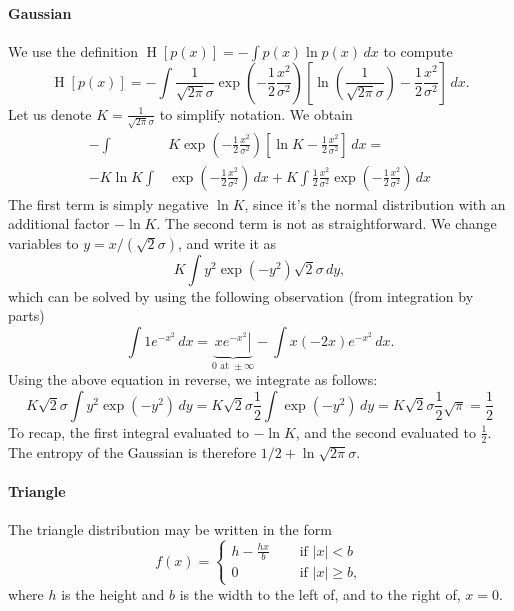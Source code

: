 \documentclass[12pt, a4paper]{article}
\newcommand{\abs}[1]{\left\lvert#1\right\rvert}
\renewcommand{\H}{\operatorname{H}}
\begin{document}
\paragraph{Gaussian} We use the definition $\H\left[p(x)\right] = - \int p(x) \ln p(x) \, dx$ to compute  
\begin{equation*}
	\H\left[p(x)\right] = 
	- \int \frac{1}{\sqrt{2 \pi} \sigma} 
	\exp \left( - \frac{1}{2} \frac{x^2}{\sigma^2} \right) 
	\left[ \ln \left( \frac{1}{\sqrt{2 \pi} \sigma } \right) - \frac{1}{2} \frac{x^2}{\sigma^2} \right] \, dx.
\end{equation*}
Let us denote $K = \frac{1}{\sqrt{2 \pi} \sigma} $ to simplify notation. We obtain
\begin{align*}
	- \int & K
	\exp \left( - \frac{1}{2} \frac{x^2}{\sigma^2} \right) 
	\left[ \ln K - \frac{1}{2} \frac{x^2}{\sigma^2} \right] \, dx = \\
	- K \ln K \int & 
	\exp \left( - \frac{1}{2} \frac{x^2}{\sigma^2} \right) \, dx + K \int  \frac{1}{2} \frac{x^2}{\sigma^2} \exp \left( - \frac{1}{2} \frac{x^2}{\sigma^2} \right)  \, dx
\end{align*}
The first term is simply negative $\ln K$, since it's the normal distribution with an additional factor $-\ln K$.
The second term is not as straightforward.
We change variables to $y = x / \left( \sqrt{2} \sigma \right)$, and write it as
\begin{equation*}
	K \int  y^2 \exp \left( - y^2 \right) \sqrt{2} \sigma \, dy,
\end{equation*}
which can be solved by using the following observation (from integration by parts)
\begin{equation*}
	\int 1 e^{-x^2} \, dx = \underbrace{\left. x e^{-x^2} \right|}_{0\text{ at } \pm \infty} - \int x (-2x) e^{-x^2} \, dx.
\end{equation*}
Using the above equation in reverse, we integrate as follows:
\begin{equation*}
	K \sqrt{2} \sigma \int  y^2 \exp \left( - y^2 \right)  \, dy = 	K \sqrt{2} \sigma \frac{1}{2}\int  \exp \left( - y^2 \right)  \, dy = K \sqrt{2} \sigma \frac{1}{2} \sqrt{\pi} = \frac{1}{2}
\end{equation*}
To recap, the first integral evaluated to $- \ln K$, and the second evaluated to $\frac{1}{2}$.
The entropy of the Gaussian is therefore $1/2 + \ln \sqrt{2 \pi } \sigma$.

\paragraph{Triangle}
The triangle distribution may be written in the form
\begin{equation*}
	f(x) = \begin{cases}
	h - \frac{hx}{b} &\quad \text{ if } \abs{x} < b\\
	0 &\quad \text{ if } \abs{x} \geq b,
	\end{cases}
\end{equation*}
where $h$ is the height and $b$ is the width to the left of, and to the right of, $x=0$.
\end{document}
